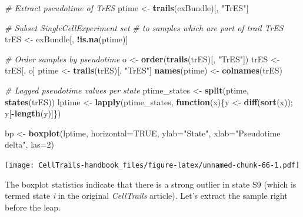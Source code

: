 \documentclass[]{book}
\newenvironment{Shaded}{\begin{snugshade}}{\end{snugshade}}
\newcommand{\KeywordTok}[1]{\textcolor[rgb]{0.13,0.29,0.53}{\textbf{#1}}}
\newcommand{\DataTypeTok}[1]{\textcolor[rgb]{0.13,0.29,0.53}{#1}}
\newcommand{\DecValTok}[1]{\textcolor[rgb]{0.00,0.00,0.81}{#1}}
\newcommand{\StringTok}[1]{\textcolor[rgb]{0.31,0.60,0.02}{#1}}
\newcommand{\CommentTok}[1]{\textcolor[rgb]{0.56,0.35,0.01}{\textit{#1}}}
\newcommand{\OtherTok}[1]{\textcolor[rgb]{0.56,0.35,0.01}{#1}}
\newcommand{\ControlFlowTok}[1]{\textcolor[rgb]{0.13,0.29,0.53}{\textbf{#1}}}
\newcommand{\OperatorTok}[1]{\textcolor[rgb]{0.81,0.36,0.00}{\textbf{#1}}}
\newcommand{\NormalTok}[1]{#1}
\theoremstyle{definition}
\theoremstyle{definition}
\theoremstyle{definition}
\theoremstyle{remark}
\begin{document}
\begin{Shaded}
\begin{Highlighting}[]
\CommentTok{# Extract pseudotime of TrES}
\NormalTok{ptime <-}\StringTok{ }\KeywordTok{trails}\NormalTok{(exBundle)[, }\StringTok{"TrES"}\NormalTok{]}

\CommentTok{# Subset SingleCellExperiment set}
\CommentTok{# to samples which are part of trail TrES}
\NormalTok{trES <-}\StringTok{ }\NormalTok{exBundle[, }\OperatorTok{!}\KeywordTok{is.na}\NormalTok{(ptime)]}

\CommentTok{# Order samples by pseudotime}
\NormalTok{o <-}\StringTok{ }\KeywordTok{order}\NormalTok{(}\KeywordTok{trails}\NormalTok{(trES)[, }\StringTok{"TrES"}\NormalTok{])}
\NormalTok{trES <-}\StringTok{ }\NormalTok{trES[, o]}
\NormalTok{ptime <-}\StringTok{ }\KeywordTok{trails}\NormalTok{(trES)[, }\StringTok{"TrES"}\NormalTok{]}
\KeywordTok{names}\NormalTok{(ptime) <-}\StringTok{ }\KeywordTok{colnames}\NormalTok{(trES)}

\CommentTok{# Lagged pseudotime values per state}
\NormalTok{ptime_states <-}\StringTok{ }\KeywordTok{split}\NormalTok{(ptime, }\KeywordTok{states}\NormalTok{(trES))}
\NormalTok{lptime <-}\StringTok{ }\KeywordTok{lapply}\NormalTok{(ptime_states, }
                 \ControlFlowTok{function}\NormalTok{(x)\{y <-}\StringTok{ }\KeywordTok{diff}\NormalTok{(}\KeywordTok{sort}\NormalTok{(x)); y[}\OperatorTok{-}\KeywordTok{length}\NormalTok{(y)]\})}

\NormalTok{bp <-}\StringTok{ }\KeywordTok{boxplot}\NormalTok{(lptime, }\DataTypeTok{horizontal=}\OtherTok{TRUE}\NormalTok{, }
              \DataTypeTok{ylab=}\StringTok{"State"}\NormalTok{, }\DataTypeTok{xlab=}\StringTok{"Pseudotime delta"}\NormalTok{, }\DataTypeTok{las=}\DecValTok{2}\NormalTok{)}
\end{Highlighting}
\end{Shaded}

\texttt{[image: CellTrails-handbook\_files/figure-latex/unnamed-chunk-66-1.pdf]}

The boxplot statistics indicate that there is a strong outlier in state
S9 (which is termed state \emph{i} in the original \emph{CellTrails}
article). Let's extract the sample right before the leap.

\begin{Shaded}
\end{Shaded}
\end{document}

